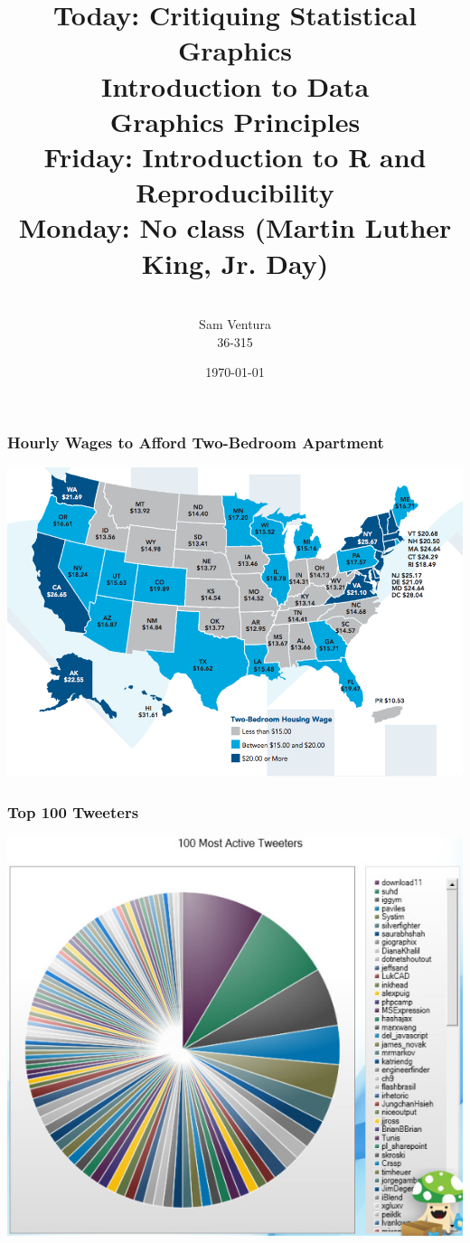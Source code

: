 \documentclass{beamer} %
\begin{document}
\title[dedup]{Today:  Critiquing Statistical Graphics\\Introduction to Data\\Graphics Principles\\Friday:  Introduction to R and Reproducibility\\Monday:  No class (Martin Luther King, Jr. Day)}


\author[Samuel L. Ventura]{\\
  \large{Sam Ventura\\36-315}}
\date{\today}


\begin{frame}
	\maketitle
	
\end{frame}


\begin{frame}\frametitle{Hourly Wages to Afford Two-Bedroom Apartment}
	\includegraphics[width=\linewidth]{hourly.png}
\end{frame}


\begin{frame}\frametitle{Top 100 Tweeters}
	\centering
	\includegraphics[width=0.77\linewidth]{tweet.jpg}
\end{frame}
\end{document}
